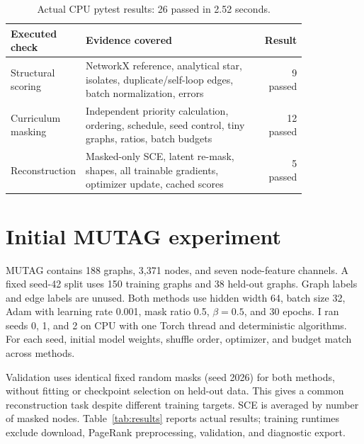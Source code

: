\documentclass{article}
\begin{document}
\begin{table}[h]
\centering\small
\begin{tabular}{p{0.24\linewidth}p{0.59\linewidth}r}
\toprule
Executed check & Evidence covered & Result\\\midrule
Structural scoring & NetworkX reference, analytical star, isolates, duplicate/self-loop edges, batch normalization, errors & 9 passed\\
Curriculum masking & Independent priority calculation, ordering, schedule, seed control, tiny graphs, ratios, batch budgets & 12 passed\\
Reconstruction & Masked-only SCE, latent re-mask, shapes, all trainable gradients, optimizer update, cached scores & 5 passed\\\bottomrule
\end{tabular}
\caption{Actual CPU pytest results: 26 passed in 2.52 seconds.}
\end{table}

\section{Initial MUTAG experiment}
MUTAG contains 188 graphs, 3,371 nodes, and seven node-feature channels. A fixed seed-42 split uses 150 training graphs and 38 held-out graphs. Graph labels and edge labels are unused. Both methods use hidden width 64, batch size 32, Adam with learning rate 0.001, mask ratio 0.5, $\beta=0.5$, and 30 epochs. I ran seeds 0, 1, and 2 on CPU with one Torch thread and deterministic algorithms. For each seed, initial model weights, shuffle order, optimizer, and budget match across methods.

Validation uses identical fixed random masks (seed 2026) for both methods, without fitting or checkpoint selection on held-out data. This gives a common reconstruction task despite different training targets. SCE is averaged by number of masked nodes. Table~\ref{tab:results} reports actual results; training runtimes exclude download, PageRank preprocessing, validation, and diagnostic export.
\end{document}
